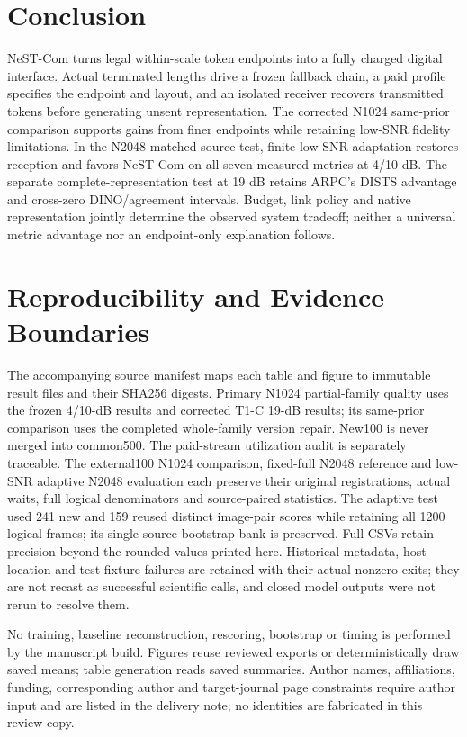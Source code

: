 \section{Conclusion}
NeST-Com turns legal within-scale token endpoints into a fully charged digital interface. Actual terminated lengths drive a frozen fallback chain, a paid profile specifies the endpoint and layout, and an isolated receiver recovers transmitted tokens before generating unsent representation. The corrected N1024 same-prior comparison supports gains from finer endpoints while retaining low-SNR fidelity limitations. In the N2048 matched-source test, finite low-SNR adaptation restores reception and favors NeST-Com on all seven measured metrics at 4/10 dB. The separate complete-representation test at 19 dB retains ARPC's DISTS advantage and cross-zero DINO/agreement intervals. Budget, link policy and native representation jointly determine the observed system tradeoff; neither a universal metric advantage nor an endpoint-only explanation follows.

\appendices
\section{Reproducibility and Evidence Boundaries}
The accompanying source manifest maps each table and figure to immutable result files and their SHA256 digests. Primary N1024 partial-family quality uses the frozen 4/10-dB results and corrected T1-C 19-dB results; its same-prior comparison uses the completed whole-family version repair. New100 is never merged into common500. The paid-stream utilization audit is separately traceable. The external100 N1024 comparison, fixed-full N2048 reference and low-SNR adaptive N2048 evaluation each preserve their original registrations, actual waits, full logical denominators and source-paired statistics. The adaptive test used 241 new and 159 reused distinct image-pair scores while retaining all 1200 logical frames; its single source-bootstrap bank is preserved. Full CSVs retain precision beyond the rounded values printed here. Historical metadata, host-location and test-fixture failures are retained with their actual nonzero exits; they are not recast as successful scientific calls, and closed model outputs were not rerun to resolve them.

No training, baseline reconstruction, rescoring, bootstrap or timing is performed by the manuscript build. Figures reuse reviewed exports or deterministically draw saved means; table generation reads saved summaries. Author names, affiliations, funding, corresponding author and target-journal page constraints require author input and are listed in the delivery note; no identities are fabricated in this review copy.

